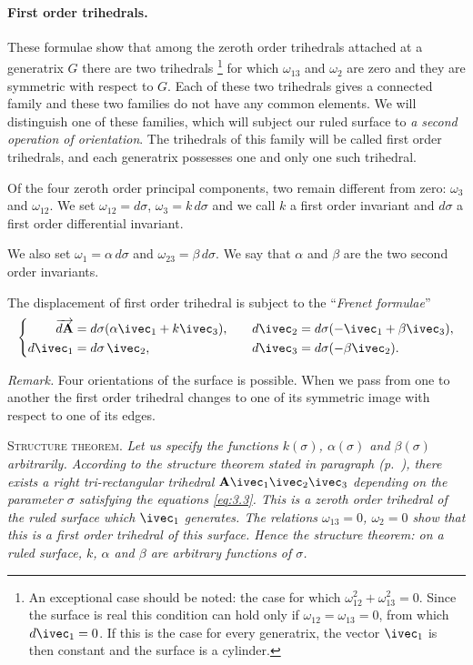 \paragraph{First order trihedrals.}
\label{sec:45}
These formulae show that among the zeroth order trihedrals attached at a generatrix $G$ there are two trihedrals \footnote{An exceptional case should be noted: the case for which $\omega_{12}^{2}+\omega_{13}^{2}=0$. Since the surface is real this condition can hold only if $\omega_{12}=\omega_{13}=0$, from which $d\ivec_{1}=0$. If this is the case for every generatrix, the vector $\ivec_{1}$ is then constant and the surface is a cylinder.} for which $\omega_{13}$ and $\omega_{2}$ are zero and they are symmetric with respect to $G$. Each of these two trihedrals gives a connected family and these two families do not have any common elements. We will distinguish one of these families, which will subject our ruled surface to \emph{a second operation of orientation}. The trihedrals of this family will be called first order trihedrals, and each generatrix possesses one and only one such trihedral.

Of the four zeroth order principal components, two remain different from zero: $\omega_{3}$ and $\omega_{12}$. We set $\omega_{12}=d\sigma$, $\omega_{3}=k\,d\sigma$ and we call $k$ a first order invariant and $d\sigma$ a first order differential invariant.

We also set $\omega_{1}=\alpha\,d\sigma$ and $\omega_{23}=\beta\,d\sigma$. We say that $\alpha$ and $\beta$ are the two second order invariants.

The displacement of first order trihedral is subject to the ``\emph{Frenet formulae}''
\begin{equation}
  \label{eq:3.3}
  \left\{
    \begin{aligned}
      \overrightarrow{d\mathbf{A}}&=d\sigma(\alpha\ivec_{1}+k\ivec_{3}),&&&d\ivec_{2}&=d\sigma(-\ivec_{1}+\beta\ivec_{3}),\\
      d\ivec_{1}&=d\sigma\,\ivec_{2},&&&d\ivec_{3}&=d\sigma(-\beta\ivec_{2}).
    \end{aligned}
  \right.
\end{equation}

\emph{Remark.} Four orientations of the surface is possible. When we pass from one to another the first order trihedral changes to one of its symmetric image with respect to one of its edges.

\somespace

\textsc{Structure theorem.} \emph{Let us specify the functions $k(\sigma)$, $\alpha(\sigma)$ and $\beta(\sigma)$ arbitrarily. According to the structure theorem stated in paragraph \emph{ (p.~\pageref{sec:7})}, there exists a right tri-rectangular trihedral $\textbf{A}\ivec_1\ivec_2\ivec_3$ depending on the parameter $\sigma$ satisfying the equations \eqref{eq:3.3}. This is a zeroth order trihedral of the ruled surface which $\ivec_{1}$ generates. The relations $\omega_{13}=0$, $\omega_{2}=0$ show that this is a first order trihedral of this surface. Hence the structure theorem: on a ruled surface, $k$, $\alpha$ and $\beta$ are arbitrary functions of $\sigma$.}

